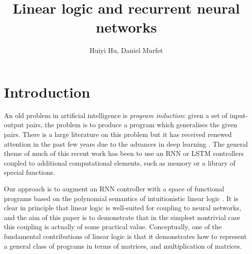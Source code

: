 \documentclass[english,letter paper,12pt,leqno]{article}
\theoremstyle{example}
\numberwithin{equation}{section}
\def\res{\operatorname{Res}}
\begin{document}
\def\Res{\res\!}
\newcommand{\ud}{\mathrm{d}}
\newcommand{\Ress}[1]{\res_{#1}\!}
\newcommand{\cat}[1]{\mathcal{#1}}
\newcommand{\lto}{\longrightarrow}
\newcommand{\xlto}[1]{\stackrel{#1}\lto}
\newcommand{\mf}[1]{\mathfrak{#1}}
\newcommand{\md}[1]{\mathscr{#1}}
\def\sus{\l}
\def\l{\,|\,}
\def\sgn{\textup{sgn}}
\newcommand{\den}[1]{\llbracket #1 \rrbracket}

\title{Linear logic and recurrent neural networks}
\author{Huiyi Hu, Daniel Murfet}

\maketitle

\section{Introduction}

An old problem in artificial intelligence is \emph{program induction}: given a set of input-output pairs, the problem is to produce a program which generalises the given pairs. There is a large literature on this problem \cite{??,??} but it has received renewed attention in the past few years due to the advances in deep learning \cite{??,??,??}. The general theme of much of this recent work has been to use an RNN or LSTM controllers coupled to additional computational elements, such as memory or a library of special functions.

Our approach is to augment an RNN controller with a space of functional programs based on the polynomial semantics of intuitionistic linear logic \cite{??}. It is clear in principle that linear logic is well-suited for coupling to neural networks, and the aim of this paper is to demonstrate that in the simplest nontrivial case this coupling is actually of some practical value. Conceptually, one of the fundamental contributions of linear logic is that it demonstrates how to represent a general class of programs in terms of matrices, and multiplication of matrices.

\end{document}
